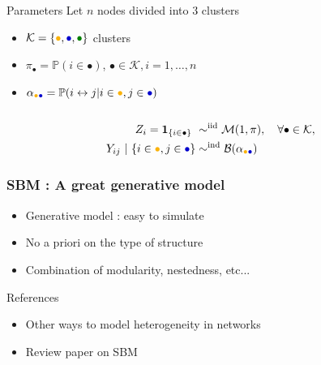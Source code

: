 \documentclass[compress,10pt]{beamer}
\begin{document}
\begin{frame}
\begin{center}
\begin{overlayarea}{\textwidth}{.5\textheight}
\begin{columns}
        \begin{column}{.5\paperwidth}
          \begin{small}
            \begin{block}{Parameters}
              Let $n$ nodes divided into $3$ clusters
              \begin{itemize}
              \item
                $\mathcal{K}=\{\textcolor{yellow!40!orange}{\bullet},\textcolor{blue!80!black}{\bullet},\textcolor{green!50!black}{\bullet}\}$
                 clusters
              \item  $\pi_\bullet  =  \mathbb{P}(i  \in  \bullet)$,
                $\bullet\in\mathcal{K},i=1,\dots,n$
              \item      $\alpha_{\textcolor{yellow!40!orange}{\bullet}\textcolor{blue!80!black}{\bullet}}     =      \mathbb{P}(i
                \leftrightarrow j | i\in\textcolor{yellow!40!orange}{\bullet},j\in\textcolor{blue!80!black}{\bullet})$
              \end{itemize}
            \end{block}
          \end{small}
        \end{column}
      \end{columns}
    \end{overlayarea}
  \end{center}
  
\begin{align*}
Z_i = \mathbf{1}_{\{i \in \bullet\}}  \ & \sim^{\text{iid}} \mathcal{M}(1,\pi), \quad \forall\bullet \in \mathcal{K}, \\ 
Y_{ij} \ | \ \{i\in\textcolor{yellow!40!orange}{\bullet},j\in\textcolor{blue!80!black}{\bullet}\}
& \sim^{\text{ind}} \mathcal{B}(\alpha_{\textcolor{yellow!40!orange}{\bullet}\textcolor{blue!80!black}{\bullet}})\\
\end{align*}

\end{frame}


\begin{frame}\frametitle{SBM : A great generative model}
\begin{itemize}
\item  Generative model : easy to simulate
\item No a priori on the type of structure
\item Combination of modularity, nestedness, etc... 
\end{itemize}


\alert{References}
\begin{itemize}
 \item Other ways to model heterogeneity in networks \cite{matias2014ESAIM}
\item Review paper on SBM \cite{Lee2019}
\end{itemize}


\end{frame}
\end{document}
